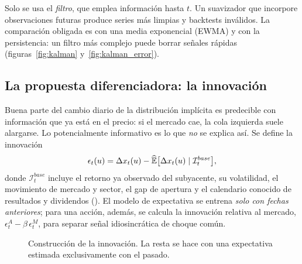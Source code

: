 Solo se usa el \emph{filtro}, que emplea información hasta $t$. Un suavizador que incorpore observaciones
futuras produce series más limpias y backtests inválidos. La comparación obligada es con una media
exponencial (EWMA) y con la persistencia: un filtro más complejo puede borrar señales rápidas
(figuras~\ref{fig:kalman} y~\ref{fig:kalman_error}).



\subsection{La propuesta diferenciadora: la innovación}\label{sec:innovacion}

Buena parte del cambio diario de la distribución implícita es predecible con información que ya está en
el precio: si el mercado cae, la cola izquierda suele alargarse. Lo potencialmente informativo es lo que
\emph{no} se explica así. Se define la innovación
\begin{equation}
\epsilon_t(u)=\Delta x_t(u)-\widehat{\mathbb{E}}\bigl[\Delta x_t(u)\mid\mathcal{I}_t^{base}\bigr],
\label{eq:innovacion}
\end{equation}
donde $\mathcal I_t^{base}$ incluye el retorno ya observado del subyacente, su volatilidad, el movimiento
de mercado y sector, el gap de apertura y el calendario conocido de resultados y dividendos
(). El modelo de expectativa se entrena \emph{solo con fechas anteriores};
para una acción, además, se calcula la innovación relativa al mercado,
$\epsilon^A_t-\beta\,\epsilon^M_t$, para separar señal idiosincrática de choque común.

\begin{figure}[H]
\centering
\resizebox{\linewidth}{!}{}
\caption{Construcción de la innovación. La resta se hace con una expectativa estimada exclusivamente con
el pasado.}
\label{fig:innovacion_diagrama}
\end{figure}

